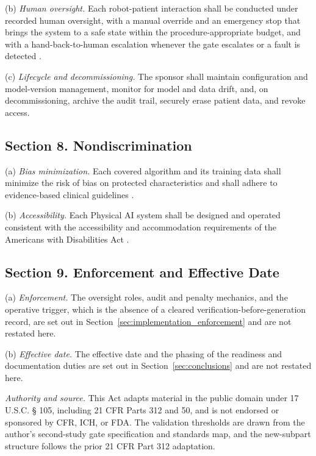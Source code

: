 (b) \textit{Human oversight.} Each robot-patient interaction shall be conducted
under recorded human oversight, with a manual override and an emergency stop that
brings the system to a safe state within the procedure-appropriate budget, and
with a hand-back-to-human escalation whenever the gate escalates or a fault is
detected \cite{iec60601}.

(c) \textit{Lifecycle and decommissioning.} The sponsor shall maintain
configuration and model-version management, monitor for model and data drift, and,
on decommissioning, archive the audit trail, securely erase patient data, and
revoke access.

\subsection{Section 8. Nondiscrimination}

(a) \textit{Bias minimization.} Each covered algorithm and its training data
shall minimize the risk of bias on protected characteristics and shall adhere to
evidence-based clinical guidelines \cite{usc-titlevi, ny-a9149}.

(b) \textit{Accessibility.} Each Physical AI system shall be designed and operated
consistent with the accessibility and accommodation requirements of the Americans
with Disabilities Act \cite{usc-ada}.

\subsection{Section 9. Enforcement and Effective Date}

(a) \textit{Enforcement.} The oversight roles, audit and penalty mechanics, and
the operative trigger, which is the absence of a cleared
verification-before-generation record, are set out in
Section~\ref{sec:implementation_enforcement} and are not restated here.

(b) \textit{Effective date.} The effective date and the phasing of the readiness
and documentation duties are set out in Section~\ref{sec:conclusions} and are not
restated here.

\vspace{0.4em}
\noindent\textit{Authority and source.} This Act adapts material in the public
domain under 17 U.S.C. § 105, including 21 CFR Parts 312 and 50, and is not
endorsed or sponsored by CFR, ICH, or FDA. The validation thresholds are drawn
from the author's second-study gate specification and standards map, and the
new-subpart structure follows the prior 21 CFR Part 312 adaptation.
